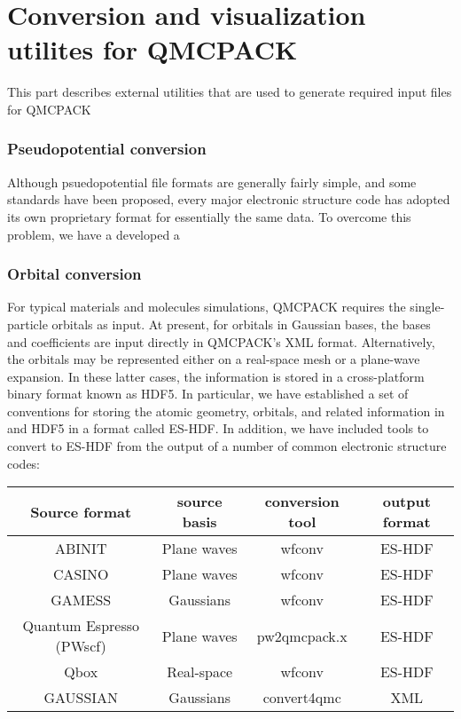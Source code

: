 \part{Conversion and visualization utilites for QMCPACK}\label{conversion.part}
This part describes external utilities that are used to generate
required input files for QMCPACK

\section{Pseudopotential conversion}
Although psuedopotential file formats are generally fairly simple, and
some standards have been proposed, every major electronic structure
code has adopted its own proprietary format for essentially the same
data.  To overcome this problem, we have a developed a 

\section{Orbital conversion}
For typical materials and molecules simulations, QMCPACK requires
the single-particle orbitals as input.  At present, for orbitals in
Gaussian bases, the bases and coefficients are input directly in
QMCPACK's XML format.  Alternatively, the orbitals may be represented
either on a real-space mesh or a plane-wave expansion.  In these
latter cases, the information is stored in a cross-platform binary
format known as HDF5.  In particular, we have established a set of
conventions for storing the atomic geometry, orbitals, and related
information in and HDF5 in a format called ES-HDF.  In addition, we
have included tools to convert to ES-HDF from the output of a number
of common electronic structure codes:

\begin{table}[H]
\centering
\begin{tabular}{|c|c|c|c|}
\hline
Source format            & source basis & conversion tool & output format \\\hline
ABINIT                   & Plane waves  & wfconv          & ES-HDF \\
CASINO                   & Plane waves  & wfconv          & ES-HDF \\
GAMESS                   & Gaussians    & wfconv          & ES-HDF \\
Quantum Espresso (PWscf) & Plane waves  & pw2qmcpack.x    & ES-HDF \\
Qbox                     & Real-space   & wfconv          & ES-HDF \\
GAUSSIAN                 & Gaussians    & convert4qmc     & XML    \\
\hline
\end{tabular}
\end{table}

